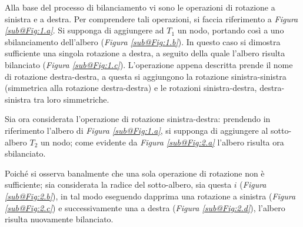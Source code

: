 \documentclass{subfiles}
\begin{document}
Alla base del processo di bilanciamento vi sono le operazioni di rotazione a sinistra e a destra.
Per comprendere tali operazioni, si faccia riferimento a \emph{Figura \ref{sub@Fig:1.a}}.
Si supponga di aggiungere ad \(T_{1}\) un nodo, portando così a uno sbilanciamento dell'albero (\emph{Figura \ref{sub@Fig:1.b}}).
In questo caso si dimostra sufficiente una singola rotazione a destra, a seguito della quale l'albero risulta bilanciato (\emph{Figura \ref{sub@Fig:1.c}}).
L'operazione appena descritta prende il nome di rotazione destra-destra,
a questa si aggiungono la rotazione sinistra-sinistra (simmetrica alla rotazione destra-destra) e le rotazioni sinistra-destra, destra-sinistra tra loro simmetriche.



Sia ora considerata l'operazione di rotazione sinistra-destra: prendendo in riferimento l'albero di \emph{Figura \ref{sub@Fig:1.a}},
si supponga di aggiungere al sotto-albero \(T_{2}\) un nodo; come evidente da \emph{Figura \ref{sub@Fig:2.a}} l'albero risulta ora sbilanciato.

Poiché si osserva banalmente che una sola operazione di rotazione non è sufficiente; sia considerata la radice del sotto-albero, sia questa \(i\) (\emph{Figura \ref{sub@Fig:2.b}}),
in tal modo eseguendo dapprima una rotazione a sinistra (\emph{Figura \ref{sub@Fig:2.c}}) e successivamente una a destra (\emph{Figura \ref{sub@Fig:2.d}}),
l'albero risulta nuovamente bilanciato.
\end{document}
